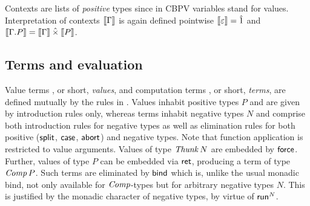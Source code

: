\documentclass[sigconf,screen,fleqn]{acmart} %
\begin{document}
Contexts are lists of \emph{positive} types since in CBPV variables stand
for values.  Interpretation of contexts $\mathopen{{[\kern-0.14em[}} \Gamma \mathclose{{]\kern-0.14em]}}$ is again defined
pointwise $\mathopen{{[\kern-0.14em[}} \varepsilon \mathclose{{]\kern-0.14em]}} = \hat{1}$ and
$\mathopen{{[\kern-0.14em[}} \Gamma.P \mathclose{{]\kern-0.14em]}} = \mathopen{{[\kern-0.14em[}} \Gamma \mathclose{{]\kern-0.14em]}} \mathbin{\hat\times} \mathopen{{[\kern-0.14em[}} P \mathclose{{]\kern-0.14em]}}$.

\subsection{Terms and evaluation}

Value terms , or short, \emph{values},
and computation terms , or short,
\emph{terms}, are defined mutually by the rules in .
Values inhabit positive types $P$ and are given by introduction rules
only, whereas terms inhabit negative types $N$ and comprise both
introduction rules for negative types as well as elimination rules for
both positive ($\mathsf{split}$, $\mathsf{case}$, $\mathsf{abort}$)
and negative types.
%
%
Note that function application is restricted to value arguments.
Values of type $\mathit{Thunk}\,N$ are embedded by $\mathsf{force}$.
Further, values of type $P$ can be embedded
via $\mathsf{ret}$, producing a term of type $\mathit{Comp}\,P$.  Such terms are
eliminated by $\mathsf{bind}$ which is, unlike the usual monadic bind, not
only available for $\mathit{Comp}$-types but for arbitrary negative types
$N$.  This is justified by the monadic character of negative
types, by virtue of $\mathsf{run}^N$.
\end{document}
